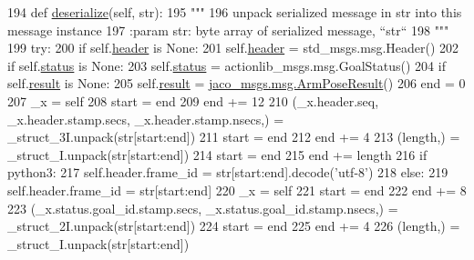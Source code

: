 \begin{DoxyCode}
194   \textcolor{keyword}{def }\hyperlink{classjaco__msgs_1_1msg_1_1__ArmPoseActionResult_1_1ArmPoseActionResult_aad6bbbfe71f9b7b895ba58834fa443e5}{deserialize}(self, str):
195     \textcolor{stringliteral}{"""}
196 \textcolor{stringliteral}{    unpack serialized message in str into this message instance}
197 \textcolor{stringliteral}{    :param str: byte array of serialized message, ``str``}
198 \textcolor{stringliteral}{    """}
199     \textcolor{keywordflow}{try}:
200       \textcolor{keywordflow}{if} self.\hyperlink{classjaco__msgs_1_1msg_1_1__ArmPoseActionResult_1_1ArmPoseActionResult_a91cd51f43f8421923ec5cdfbfd6a340f}{header} \textcolor{keywordflow}{is} \textcolor{keywordtype}{None}:
201         self.\hyperlink{classjaco__msgs_1_1msg_1_1__ArmPoseActionResult_1_1ArmPoseActionResult_a91cd51f43f8421923ec5cdfbfd6a340f}{header} = std\_msgs.msg.Header()
202       \textcolor{keywordflow}{if} self.\hyperlink{classjaco__msgs_1_1msg_1_1__ArmPoseActionResult_1_1ArmPoseActionResult_ab5014de96d390234ceea56bed94a106b}{status} \textcolor{keywordflow}{is} \textcolor{keywordtype}{None}:
203         self.\hyperlink{classjaco__msgs_1_1msg_1_1__ArmPoseActionResult_1_1ArmPoseActionResult_ab5014de96d390234ceea56bed94a106b}{status} = actionlib\_msgs.msg.GoalStatus()
204       \textcolor{keywordflow}{if} self.\hyperlink{classjaco__msgs_1_1msg_1_1__ArmPoseActionResult_1_1ArmPoseActionResult_a6debdadfdee3118c370d0a82f62c56ee}{result} \textcolor{keywordflow}{is} \textcolor{keywordtype}{None}:
205         self.\hyperlink{classjaco__msgs_1_1msg_1_1__ArmPoseActionResult_1_1ArmPoseActionResult_a6debdadfdee3118c370d0a82f62c56ee}{result} = \hyperlink{classjaco__msgs_1_1msg_1_1__ArmPoseResult_1_1ArmPoseResult}{jaco\_msgs.msg.ArmPoseResult}()
206       end = 0
207       \_x = self
208       start = end
209       end += 12
210       (\_x.header.seq, \_x.header.stamp.secs, \_x.header.stamp.nsecs,) = \_struct\_3I.unpack(str[start:end])
211       start = end
212       end += 4
213       (length,) = \_struct\_I.unpack(str[start:end])
214       start = end
215       end += length
216       \textcolor{keywordflow}{if} python3:
217         self.header.frame\_id = str[start:end].decode(\textcolor{stringliteral}{'utf-8'})
218       \textcolor{keywordflow}{else}:
219         self.header.frame\_id = str[start:end]
220       \_x = self
221       start = end
222       end += 8
223       (\_x.status.goal\_id.stamp.secs, \_x.status.goal\_id.stamp.nsecs,) = \_struct\_2I.unpack(str[start:end])
224       start = end
225       end += 4
226       (length,) = \_struct\_I.unpack(str[start:end])

\end{DoxyCode}
